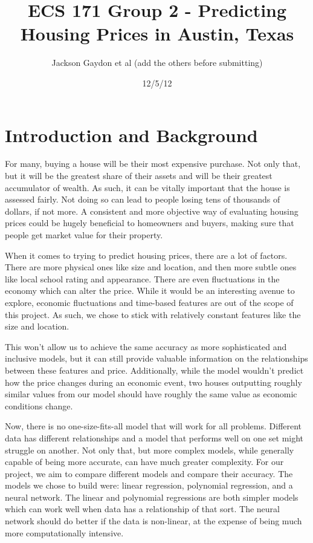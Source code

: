 \documentclass[a4paper]{article}
\begin{document}
	\title{ECS 171 Group 2 - Predicting Housing Prices in Austin, Texas}
	\author{Jackson Gaydon et al (add the others before submitting)}
	\date{12/5/12}
	\maketitle
	
	\section{Introduction and Background} 
	
	For many, buying a house will be their most expensive purchase. Not only that, but it will be the greatest share of their assets and will be their greatest accumulator of wealth. As such, it can be vitally important that the house is assessed fairly. Not doing so can lead to people losing tens of thousands of dollars, if not more. A consistent and more objective way of evaluating housing prices could be hugely beneficial to homeowners and buyers, making sure that people get market value for their property.
	
	When it comes to trying to predict housing prices, there are a lot of factors. There are more physical ones like size and location, and then more subtle ones like local school rating and appearance. There are even fluctuations in the economy which can alter the price. While it would be an interesting avenue to explore, economic fluctuations and time-based features are out of the scope of this project. As such, we chose to stick with relatively constant features like the size and location.
	
	This won’t allow us to achieve the same accuracy as more sophisticated and inclusive models, but it can still provide valuable information on the relationships between these features and price. Additionally, while the model wouldn’t predict how the price changes during an economic event, two houses outputting roughly similar values from our model should have roughly the same value as economic conditions change. 
	
	Now, there is no one-size-fits-all model that will work for all problems. Different data has different relationships and a model that performs well on one set might struggle on another. Not only that, but more complex models, while generally capable of being more accurate, can have much greater complexity. For our project, we aim to compare different models and compare their accuracy. The models we chose to build were: linear regression, polynomial regression, and a neural network. The linear and polynomial regressions are both simpler models which can work well when data has a relationship of that sort. The neural network should do better if the data is non-linear, at the expense of being much more computationally intensive.
	
\end{document}
